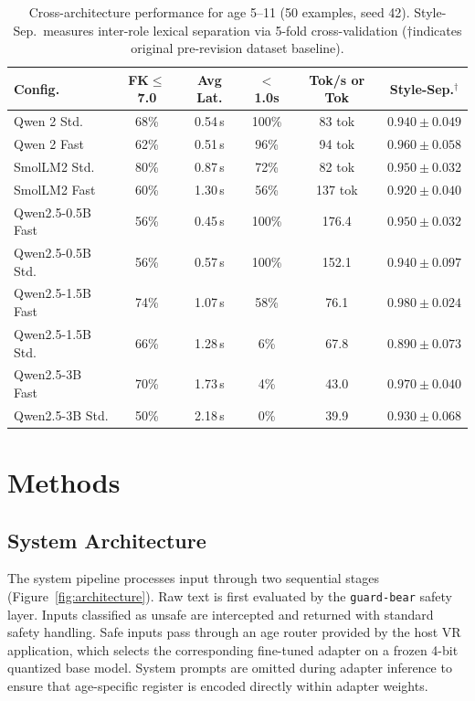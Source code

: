 \documentclass[pdflatex,sn-mathphys-num]{sn-jnl-official}%
\begin{document}
\begin{table}[!h]
  \centering
  \caption{Cross-architecture performance for age 5--11 (50 examples, seed 42). Style-Sep.\ measures inter-role lexical separation via 5-fold cross-validation ($\dagger$indicates original pre-revision dataset baseline).}
  \label{tab:crossarch}
  \scriptsize
  \setlength{\tabcolsep}{3pt}
  \begin{tabular}{@{}lccccc@{}}
    \toprule
    Config. & FK$\leq$7.0 & Avg Lat. & $<$1.0s & Tok/s or Tok & Style-Sep.$^\dagger$ \\
    \midrule
    Qwen 2 Std.       & 68\% & 0.54\,s & 100\% & 83 tok  & $0.940 \pm 0.049$ \\
    Qwen 2 Fast       & 62\% & 0.51\,s & 96\%  & 94 tok  & $0.960 \pm 0.058$ \\
    SmolLM2 Std.      & 80\% & 0.87\,s & 72\%  & 82 tok  & $0.950 \pm 0.032$ \\
    SmolLM2 Fast      & 60\% & 1.30\,s & 56\%  & 137 tok & $0.920 \pm 0.040$ \\
    Qwen2.5-0.5B Fast & 56\% & 0.45\,s & 100\% & 176.4   & $0.950 \pm 0.032$ \\
    Qwen2.5-0.5B Std. & 56\% & 0.57\,s & 100\% & 152.1   & $0.940 \pm 0.097$ \\
    Qwen2.5-1.5B Fast & 74\% & 1.07\,s & 58\%  & 76.1    & $\mathbf{0.980 \pm 0.024}$ \\
    Qwen2.5-1.5B Std. & 66\% & 1.28\,s & 6\%   & 67.8    & $0.890 \pm 0.073$ \\
    Qwen2.5-3B Fast   & 70\% & 1.73\,s & 4\%   & 43.0    & $0.970 \pm 0.040$ \\
    Qwen2.5-3B Std.   & 50\% & 2.18\,s & 0\%   & 39.9    & $0.930 \pm 0.068$ \\
    \bottomrule
  \end{tabular}
\end{table}

\section{Methods}\label{sec:methodology}

\subsection{System Architecture}\label{sec:architecture}

The system pipeline processes input through two sequential stages (Figure~\ref{fig:architecture}). Raw text is first evaluated by the \texttt{guard-bear} safety layer. Inputs classified as unsafe are intercepted and returned with standard safety handling. Safe inputs pass through an age router provided by the host VR application, which selects the corresponding fine-tuned adapter on a frozen 4-bit quantized base model. System prompts are omitted during adapter inference to ensure that age-specific register is encoded directly within adapter weights.
\end{document}
